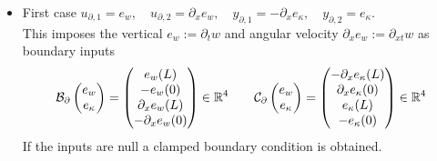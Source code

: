 \begin{itemize}
	\item {First case} ${u}_{\partial, 1} = e_w, \quad {u}_{\partial, 2} = \partial_x e_w, \quad {y}_{\partial, 1} = -\partial_{x}e_\kappa, \quad {y}_{\partial, 2} = e_\kappa$. \\
	This imposes the vertical $e_w:= \partial_t w$ and angular velocity $\partial_x e_w:= \partial_{xt} w$ as boundary inputs
	\begin{equation}
	\mathcal{B}_\partial \begin{pmatrix}
	e_w \\ e_\kappa \\
	\end{pmatrix} = \begin{pmatrix}
	e_w(L) \\ -e_w(0) \\ \partial_x e_w(L) \\ -\partial_x e_w(0)
	\end{pmatrix} \in \mathbb{R}^4 \qquad 
	\mathcal{C}_\partial \begin{pmatrix}
	e_w \\ e_\kappa \\
	\end{pmatrix} = \begin{pmatrix}
	-\partial_x e_\kappa(L) \\ \partial_x e_\kappa(0) \\ e_\kappa(L) \\ -e_\kappa(0) \\ 
	\end{pmatrix} \in \mathbb{R}^4
	\end{equation}
	If the inputs are null a clamped boundary condition is obtained.
	
	
	

\end{itemize}
